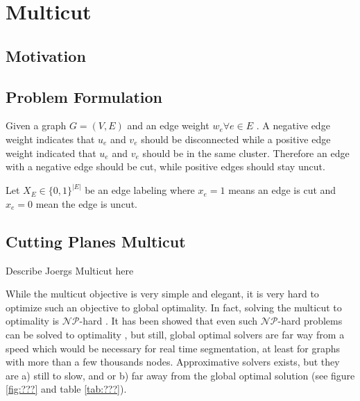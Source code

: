 \flushleft
\chapter{Multicut}\label{ch:multicut} 

\section{Motivation}\label{sec:mc_motivation}


\section{Problem Formulation}\label{sec:mc_problem_formulation}


Given a graph $G=(V,E)$ and an edge weight $w_e  \forall e \in E $ .
A negative edge weight indicates that $u_e$ and $v_e$ should be
disconnected while a positive edge weight indicated that $u_e$ and $v_e$ should be in the same cluster. Therefore an edge with a negative edge should be cut, while positive edges should stay uncut.

Let $X_E \in \{0,1\}^{|E|}$ be an edge labeling where $x_e=1$ means an edge is
cut and $x_e=0$ mean the edge is uncut. 






\section{Cutting Planes Multicut}\label{sec:cp_multicut}

Describe Joergs Multicut here





While the multicut objective is very simple and elegant, it is very
hard to optimize such an objective to global optimality.
In fact, solving the multicut to optimality is $\mathcal{NP}$-hard \cite{???} 
.
It has been showed that even such $\mathcal{NP}$-hard problems can
be solved to optimality \cite{andres_2011_iccv,kappes_2011_emmcvpr}, but still,
global optimal solvers are far way from a  speed which would be necessary for
real time segmentation, at least for  graphs with more than a few thousands nodes. 
Approximative solvers exists, but they are a) still to slow, and or b) far away from the global optimal solution (see figure \ref{fig:???} and table \ref{tab:???}).

